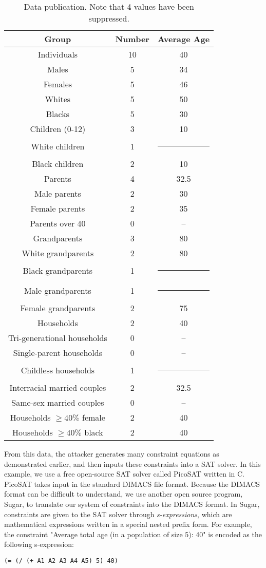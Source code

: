 \documentclass[5p,times,11pt]{elsarticle}
\begin{document}
\begin{table}[t]
\begin{tabular}{c|c|c}
Group & Number & Average Age \\
\hline
Individuals & 10 & 40 \\
Males & 5 & 34 \\
Females & 5 & 46 \\
Whites & 5 & 50 \\
Blacks & 5 & 30 \\
\hline
Children (0-12) & 3 & 10 \\
White children & 1 & \multicolumn{1}{c}{\rule{6mm}{3mm}} \\
Black children & 2 & 10 \\
\hline
Parents & 4 & 32.5 \\
Male parents & 2 & 30 \\
Female parents & 2 & 35 \\
Parents over 40 & 0 & -- \\
\hline
Grandparents & 3 & 80 \\
White grandparents & 2 & 80 \\
Black grandparents & 1 & \multicolumn{1}{c}{\rule{6mm}{3mm}} \\
Male grandparents & 1 & \multicolumn{1}{c}{\rule{6mm}{3mm}} \\
Female grandparents & 2 & 75 \\
\hline
Households & 2 & 40 \\
Tri-generational households & 0 & -- \\
Single-parent households & 0 & -- \\
Childless households & 1 & \multicolumn{1}{c}{\rule{6mm}{3mm}} \\
Interracial married couples & 2 & 32.5 \\
Same-sex married couples & 0 & -- \\
Households $\geq 40\% $ female & 2 & 40 \\
Households $\geq 40\% $ black & 2 & 40 \\

\hline
\end{tabular}
\caption{Data publication. Note that 4 values have been suppressed.}\label{publishedstatsbig}
\end{table}

From this data, the attacker generates many constraint equations as demonstrated earlier,
and then inputs these constraints into a SAT solver. In this example, we use a free open-source SAT solver
called PicoSAT written in C. PicoSAT takes input in the standard DIMACS file format. Because the DIMACS format can be difficult to understand, we use another open source program, Sugar\cite{sugar}, to translate our system of constraints into the DIMACS format. In Sugar, constraints are given to the SAT solver through \textit{s-expressions}, which are mathematical expressions written in a special nested prefix form. For example, the constraint "Average total age (in a population of size 5): 40" is encoded as the following s-expression:
\begin{verbatim}
(= (/ (+ A1 A2 A3 A4 A5) 5) 40)
\end{verbatim}
\end{document}

